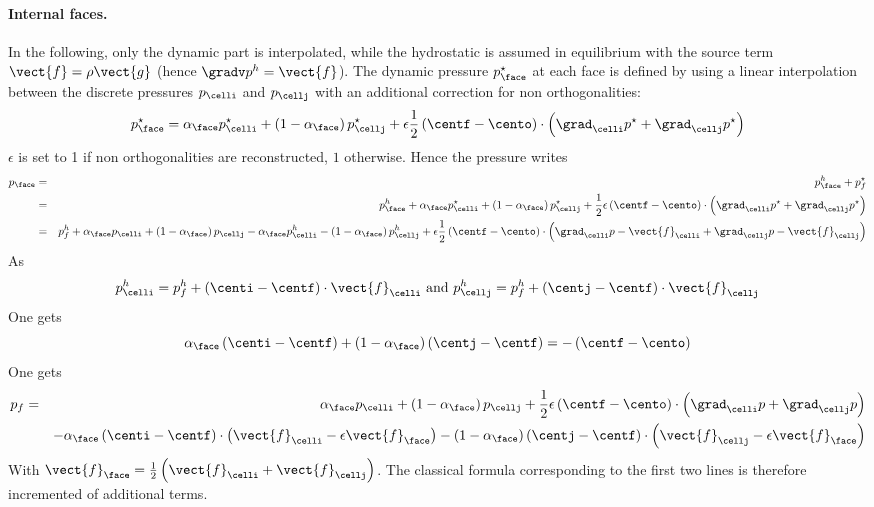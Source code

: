 \paragraph{Internal faces.} In the following, only the dynamic part is
interpolated, while the hydrostatic is assumed in equilibrium with the source
term $\vect{f}=\rho\vect{g}$ (hence $\gradv p^h=\vect{f}$). The dynamic pressure
$p_{\face}^\star$ at each face is defined by using a linear interpolation
between the discrete pressures $p_{\celli}$ and $p_{\cellj}$ with an additional
correction for non orthogonalities:
\begin{equation}
	p_{\face}^\star=\alpha_{\face}p_{\celli}^\star+\left(1-\alpha_{\face}\right)p_{\cellj}^\star+\epsilon\frac{1}{2}\left(\centf-\cento\right)\cdot\left(\grad_{\celli}{p}^\star+\grad_{\cellj}{p}^\star\right)
\end{equation}
$\epsilon$ is set to 1 if non orthogonalities are reconstructed, $1$ otherwise.
Hence the pressure writes
\begin{align*}
	p_{\face}&=&p_{\face}^{h}+p_{f}^\star \\
	&=&p_{\face}^{h}+\alpha_{\face}p_{\celli}^\star+\left(1-\alpha_{\face}\right)p_{\cellj}^\star+\frac{1}{2}\epsilon\left(\centf-\cento\right)\cdot\left(\grad_{\celli}{p}^\star+\grad_{\cellj}{p}^\star\right) \\
	&=&p_{f}^{h}+\alpha_{\face}p_{\celli}+\left(1-\alpha_{\face}\right)p_{\cellj}-\alpha_{\face}p_{\celli}^{h}-\left(1-\alpha_{\face}\right)p_{\cellj}^{h}+\epsilon\frac{1}{2}\left(\centf-\cento\right)\cdot\left(\grad_{\celli}{p}-\vect{f}_{\celli}+\grad_{\cellj}{p}-\vect{f}_{\cellj}\right) \\
\end{align*}
As
\begin{equation}
	p_{\celli}^{h}=p_{f}^{h}+\left(\centi-\centf\right)\cdot\vect{f}_{\celli} \text{ and }
	p_{\cellj}^{h}=p_{f}^{h}+\left(\centj-\centf\right)\cdot\vect{f}_{\cellj}
\end{equation}
One gets
\begin{equation}
	\alpha_{\face}\left(\centi-\centf\right)+\left(1-\alpha_{\face}\right)\left(\centj-\centf\right)=-\left(\centf-\cento\right)
\end{equation}
One gets
\begin{align*}
	p_{f}&=&\alpha_{\face}p_{\celli}+\left(1-\alpha_{\face}\right)p_{\cellj}+\frac{1}{2}\epsilon\left(\centf-\cento\right)\cdot\left(\grad_{\celli}{p}+\grad_{\cellj}{p}\right) \\ &&-\alpha_{\face}\left(\centi-\centf\right)\cdot\left(\vect{f}_{\celli}-\epsilon\vect{f}_{\face}\right)-\left(1-\alpha_{\face}\right)\left(\centj-\centf\right)\cdot\left(\vect{f}_{\cellj}-\epsilon\vect{f}_{\face}\right)
\end{align*}
With $\vect{f}_{\face}=\frac{1}{2}\left(\vect{f}_{\celli}+\vect{f}_{\cellj}\right)$.
The classical formula corresponding to the first two lines is therefore incremented
of additional terms.

